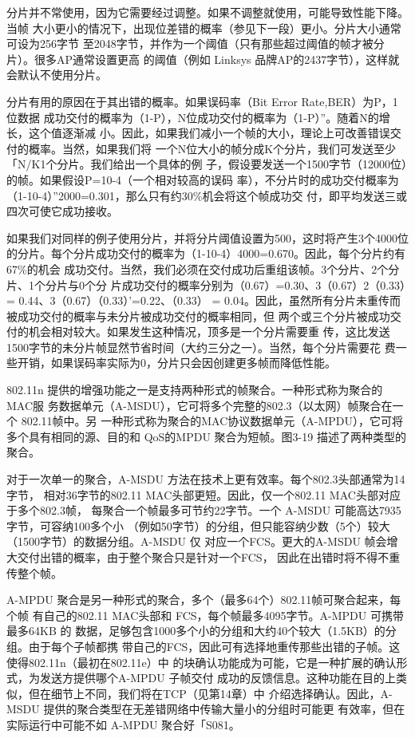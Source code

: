 分片并不常使用，因为它需要经过调整。如果不调整就使用，可能导致性能下降。当帧
大小更小的情况下，出现位差错的概率（参见下一段）更小。分片大小通常可设为256字节
至2048字节，并作为一个阈值（只有那些超过阈值的帧才被分片）。很多AP通常设置更高
的阈值（例如 Linksys 品牌AP的2437字节），这样就会默认不使用分片。

分片有用的原因在于其出错的概率。如果误码率（Bit Error Rate,BER）为P，1 位数据
成功交付的概率为（1-P），N位成功交付的概率为（1-P）”。随着N的增长，这个值逐渐减
小。因此，如果我们减小一个帧的大小，理论上可改善错误交付的概率。当然，如果我们将
一个N位大小的帧分成K个分片，我们可发送至少「N/K1个分片。我们给出一个具体的例
子，假设要发送一个1500字节（12000位）的帧。如果假设P=10-4（一个相对较高的误码
率），不分片时的成功交付概率为（1-10-4）”2000=0.301，那么只有约30\%机会将这个帧成功交
付，即平均发送三或四次可使它成功接收。

如果我们对同样的例子使用分片，并将分片阈值设置为500，这时将产生3个4000位
的分片。每个分片成功交付的概率为（1-10-4）4000=0.670。因此，每个分片约有67\%的机会
成功交付。当然，我们必须在交付成功后重组该帧。3个分片、2个分片、1个分片与0个分
片成功交付的概率分别为（0.67）=0.30、3（0.67）2（0.33）= 0.44、3（0.67）（0.33）’=0.22、（0.33） =
0.04。因此，虽然所有分片未重传而被成功交付的概率与未分片被成功交付的概率相同，但
两个或三个分片被成功交付的机会相对较大。如果发生这种情况，顶多是一个分片需要重
传，这比发送1500字节的未分片帧显然节省时间（大约三分之一）。当然，每个分片需要花
费一些开销，如果误码率实际为0，分片只会因创建更多帧而降低性能。

802.11n 提供的增强功能之一是支持两种形式的帧聚合。一种形式称为聚合的MAC服
务数据单元（A-MSDU），它可将多个完整的802.3（以太网）帧聚合在一个 802.11帧中。另
一种形式称为聚合的MAC协议数据单元（A-MPDU），它可将多个具有相同的源、目的和
QoS的MPDU 聚合为短帧。图3-19 描述了两种类型的聚合。

对于一次单一的聚合，A-MSDU 方法在技术上更有效率。每个802.3头部通常为14字节，
相对36字节的802.11 MAC头部更短。因此，仅一个802.11 MAC头部对应于多个802.3帧，
每聚合一个帧最多可节约22字节。一个 A-MSDU 可能高达7935字节，可容纳100多个小
（例如50字节）的分组，但只能容纳少数（5个）较大（1500字节）的数据分组。A-MSDU 仅
对应一个FCS。更大的A-MSDU 帧会增大交付出错的概率，由于整个聚合只是针对一个FCS，
因此在出错时将不得不重传整个帧。

A-MPDU 聚合是另一种形式的聚合，多个（最多64个）802.11帧可聚合起来，每个帧
有自己的802.11 MAC头部和 FCS，每个帧最多4095字节。A-MPDU 可携带最多64KB 的
数据，足够包含1000多个小的分组和大约40个较大（1.5KB）的分组。由于每个子帧都携
带自己的FCS，因此可有选择地重传那些出错的子帧。这使得802.11n（最初在802.11e）中
的块确认功能成为可能，它是一种扩展的确认形式，为发送方提供哪个A-MPDU 子帧交付
成功的反馈信息。这种功能在目的上类似，但在细节上不同，我们将在TCP（见第14章）中
介绍选择确认。因此，A-MSDU 提供的聚合类型在无差错网络中传输大量小的分组时可能更
有效率，但在实际运行中可能不如 A-MPDU 聚合好「S081。

